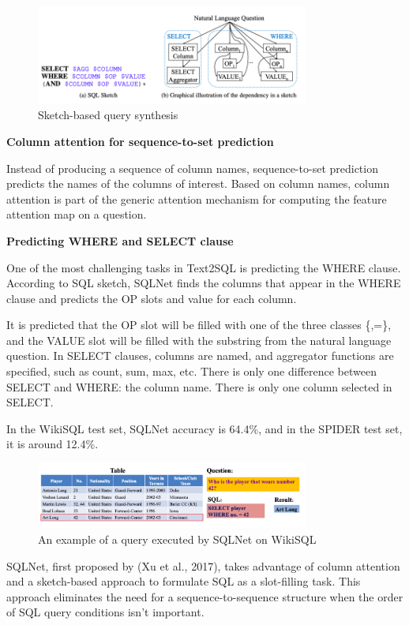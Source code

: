 \begin{figure}[htb]
    \centering
    \includegraphics[width=0.8\textwidth]{pics/sqlnet/sketch-based.png}
    \caption{Sketch-based query synthesis}
    \label{fig:sketch-based}
\end{figure}

\textbf{Column attention for sequence-to-set prediction}

Instead of producing a sequence of column names, sequence-to-set prediction predicts the names of the columns of interest.
Based on column names, column attention is part of the generic attention mechanism for computing the feature attention map on a question.

\textbf{Predicting WHERE and SELECT clause}

One of the most challenging tasks in Text2SQL is predicting the WHERE clause.
According to SQL sketch, SQLNet finds the columns that appear in the WHERE clause and predicts the OP slots and value for each column.

It is predicted that the OP slot will be filled with one of the three classes \{<,>,=\}, and the VALUE slot will be filled with the substring from the natural language question.
In SELECT clauses, columns are named, and aggregator functions are specified, such as count, sum, max, etc. There is only one difference between SELECT and WHERE: the column name. There is only one column selected in SELECT.

In the WikiSQL test set, SQLNet accuracy is 64.4\%, and in the SPIDER test set, it is around 12.4\%.

\begin{figure}[htb]
    \centering
    \includegraphics[width=0.8\textwidth]{pics/sqlnet/sqlnet-task.png}
    \caption{An example of a query executed by SQLNet on WikiSQL}
    \label{fig:sqlnet-task}
\end{figure}


SQLNet, first proposed by (Xu et al., 2017), takes advantage of column attention and a sketch-based approach to formulate SQL as a slot-filling task. This approach eliminates the need for a sequence-to-sequence structure when the order of SQL query conditions isn't important.